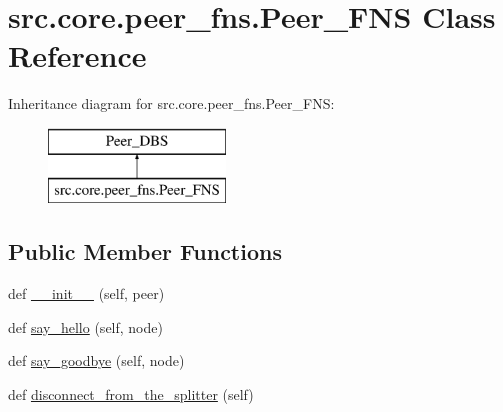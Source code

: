 \hypertarget{classsrc_1_1core_1_1peer__fns_1_1Peer__FNS}{}\section{src.\+core.\+peer\+\_\+fns.\+Peer\+\_\+\+F\+N\+S Class Reference}
\label{classsrc_1_1core_1_1peer__fns_1_1Peer__FNS}
Inheritance diagram for src.\+core.\+peer\+\_\+fns.\+Peer\+\_\+\+F\+N\+S\+:\begin{figure}[H]
\begin{center}
\leavevmode
\includegraphics[height=2.000000cm]{classsrc_1_1core_1_1peer__fns_1_1Peer__FNS}
\end{center}
\end{figure}
\subsection*{Public Member Functions}
\begin{DoxyCompactItemize}
\item 
def \hyperlink{classsrc_1_1core_1_1peer__fns_1_1Peer__FNS_add62365f0e76e237a2afea266d6d8e9f}{\+\_\+\+\_\+init\+\_\+\+\_\+} (self, peer)
\item 
def \hyperlink{classsrc_1_1core_1_1peer__fns_1_1Peer__FNS_a2410af318363868b00f0f8fa18f397a7}{say\+\_\+hello} (self, node)
\item 
def \hyperlink{classsrc_1_1core_1_1peer__fns_1_1Peer__FNS_ae515a024ecc249ab904593624193fa96}{say\+\_\+goodbye} (self, node)
\item 
def \hyperlink{classsrc_1_1core_1_1peer__fns_1_1Peer__FNS_a951e42dc0a6f4be5c1af68556be798f7}{disconnect\+\_\+from\+\_\+the\+\_\+splitter} (self)
\end{DoxyCompactItemize}
